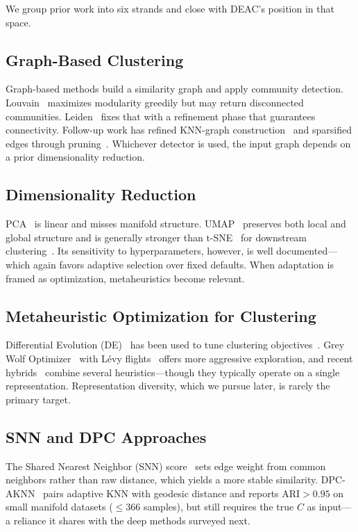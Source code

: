 \documentclass[journal]{IEEEtran}
\begin{document}
We group prior work into six strands and close with DEAC's position in that space.

\subsection{Graph-Based Clustering}
Graph-based methods build a similarity graph and apply community detection. Louvain~\cite{blondel2008fast} maximizes modularity greedily but may return disconnected communities. Leiden~\cite{traag2019louvain} fixes that with a refinement phase that guarantees connectivity. Follow-up work has refined KNN-graph construction~\cite{brito1997connectivity} and sparsified edges through pruning~\cite{satuluri2011local}. Whichever detector is used, the input graph depends on a prior dimensionality reduction.

\subsection{Dimensionality Reduction}
PCA~\cite{jolliffe2002principal} is linear and misses manifold structure. UMAP~\cite{mcinnes2018umap} preserves both local and global structure and is generally stronger than t-SNE~\cite{van2008visualizing} for downstream clustering~\cite{becht2019dimensionality}. Its sensitivity to hyperparameters, however, is well documented---which again favors adaptive selection over fixed defaults. When adaptation is framed as optimization, metaheuristics become relevant.

\subsection{Metaheuristic Optimization for Clustering}
Differential Evolution (DE)~\cite{storn1997differential} has been used to tune clustering objectives~\cite{das2008automatic}. Grey Wolf Optimizer~\cite{mirjalili2014grey} with L\'{e}vy flights~\cite{yang2010nature} offers more aggressive exploration, and recent hybrids~\cite{faris2018grey} combine several heuristics---though they typically operate on a single representation. Representation diversity, which we pursue later, is rarely the primary target.

\subsection{SNN and DPC Approaches}
The Shared Nearest Neighbor (SNN) score~\cite{ertoz2003finding} sets edge weight from common neighbors rather than raw distance, which yields a more stable similarity. DPC-AKNN~\cite{wang2026density} pairs adaptive KNN with geodesic distance and reports ARI${>}0.95$ on small manifold datasets (${\leq}366$ samples), but still requires the true $C$ as input---a reliance it shares with the deep methods surveyed next.
\end{document}

